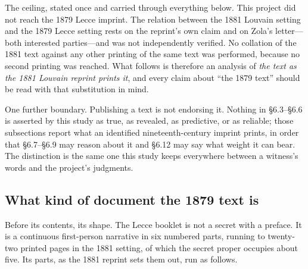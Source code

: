 The ceiling, stated once and carried through everything below. This
project did not reach the 1879 Lecce imprint. The relation between
the 1881 Louvain setting and the 1879 Lecce setting rests on the
reprint's own claim and on Zola's letter---both interested
parties---and was not independently verified. No collation of the
1881 text against any other printing of the same text was performed,
because no second printing was reached. What follows is therefore an
analysis of \emph{the text as the 1881 Louvain reprint prints it},
and every claim about ``the 1879 text'' should be read with that
substitution in mind.

One further boundary. Publishing a text is not endorsing it.
Nothing in \S6.3--\S6.6 is asserted by this study as true, as
revealed, as predictive, or as reliable; those subsections report
what an identified nineteenth-century imprint prints, in order that
\S6.7--\S6.9 may reason about it and \S6.12 may say what weight it
can bear. The distinction is the same one this study keeps
everywhere between a witness's words and the project's judgments.

\subsection{What kind of document the 1879 text is}

Before its contents, its shape. The Lecce booklet is not a secret
with a preface. It is a continuous first-person narrative in six
numbered parts, running to twenty-two printed pages in the 1881
setting, of which the secret proper occupies about five. Its parts,
as the 1881 reprint sets them out, run as follows.


